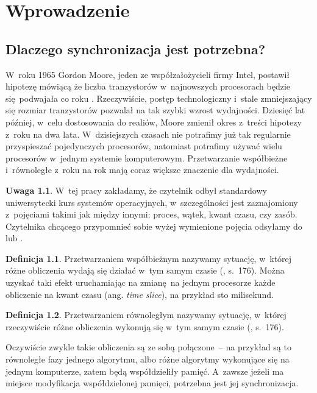 \documentclass[shortabstract]{iithesis}
\author{Julian Pszczołowski}
\theoremstyle{definition} \newtheorem*{definition}{Definicja}
\theoremstyle{definition} \newtheorem*{example}{Przykład}
\theoremstyle{definition} \newtheorem*{remark}{Uwaga}
\begin{document}
\chapter{Wprowadzenie}
\section{Dlaczego synchronizacja jest potrzebna?}
\label{sec:1}

W~roku 1965 Gordon Moore, jeden ze współzałożycieli firmy Intel, postawił hipotezę mówiącą
że liczba tranzystorów w~najnowszych procesorach będzie się podwajała co roku \cite{bib:moore_law}.
Rzeczywiście, postęp technologiczny i~stale zmniejszający się rozmiar tranzystorów pozwalał na tak
szybki wzrost wydajności.
Dziesięć lat później, w~celu dostosowania do realiów, Moore zmienił okres z~treści hipotezy z~roku
na dwa lata.
W~dzisiejszych czasach nie potrafimy już tak regularnie przyspieszać pojedynczych procesorów,
natomiast potrafimy używać wielu procesorów w~jednym systemie komputerowym.
Przetwarzanie współbieżne i~równoległe z~roku na rok mają coraz większe znaczenie dla wydajności.

\begin{remark}
W~tej pracy zakładamy, że czytelnik odbył standardowy uniwersytecki kurs systemów operacyjnych,
w~szczególności jest zaznajomiony z~pojęciami takimi jak między innymi: proces, wątek, kwant czasu, czy zasób.
Czytelnika chcącego przypomnieć sobie wyżej wymienione pojęcia odsyłamy do \cite{bib:stallings}
lub \cite{bib:tanenbaum}.
\end{remark}

\begin{definition}
Przetwarzaniem współbieżnym nazywamy sytuację, w~której różne obliczenia wydają się działać w~tym samym
czasie (\cite{bib:stallings}, s.~176). Można uzyskać taki efekt uruchamiając na zmianę na jednym
procesorze każde obliczenie na kwant czasu (ang. \textit{time slice}), na przykład sto milisekund.
\end{definition}
\begin{definition}
Przetwarzaniem równoległym nazywamy sytuację, w~której rzeczywiście różne obliczenia wykonują się w~tym
samym czasie (\cite{bib:stallings}, s.~176).
\end{definition}

Oczywiście zwykle takie obliczenia są ze sobą połączone~-- na przykład są to równoległe fazy jednego algorytmu,
albo różne algorytmy wykonujące się na jednym komputerze, zatem będą współdzieliły
pamięć. A~zawsze jeżeli ma miejsce modyfikacja współdzielonej pamięci, potrzebna jest jej synchronizacja.
\end{document}
